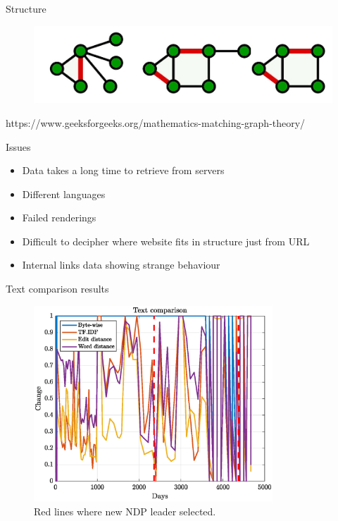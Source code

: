 \documentclass[10pt]{beamer}
\begin{document}
\begin{frame}{Structure}
\vspace{20mm}
\begin{figure}
\centering
\includegraphics[scale=0.3]{GRAPH-Matching2}
\end{figure}

\vspace{20mm}

\footnotesize https://www.geeksforgeeks.org/mathematics-matching-graph-theory/
\end{frame}

\begin{frame}{Issues}
\large
\begin{itemize}
\itemsep1.0em
\item Data takes a long time to retrieve from servers
\item Different languages
\item Failed renderings
\item Difficult to decipher where website fits in structure just from URL
\item Internal links data showing strange behaviour
\end{itemize}
\end{frame}

\begin{frame}{Text comparison results}
  \begin{figure}
    \centering
    \includegraphics[width = 0.8\textwidth]{text_comparison}
    \caption{Red lines where new NDP leader selected.}
  \end{figure}
\end{frame}
\end{document}
